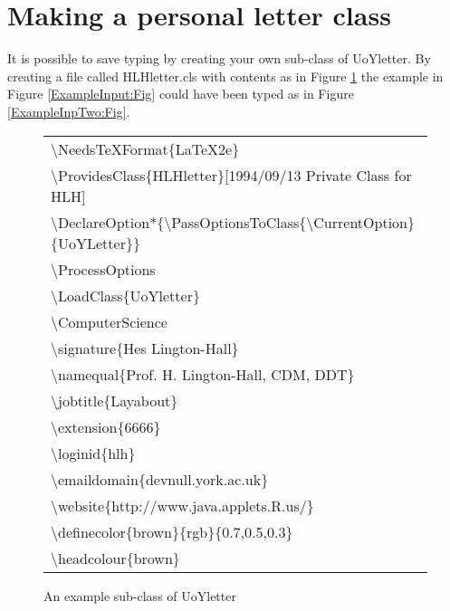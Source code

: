 \documentclass[12pt,a4paper]{article}
\newcommand{\cmdsty}[1]{\textsf{#1}}
\newcommand{\cmd}[1]{\cmdsty{\textbackslash#1}}
\newcommand{\pcmd}[2]{\cmdsty{\cmd{#1}$\{$#2$\}$}}
\begin{document}
\section{Making a personal letter class}

It is possible to save typing by creating your own sub-class of
\cmdsty{UoYletter}.  By creating a file called \cmdsty{HLHletter.cls}
with contents as in Figure \ref{Cls:Fig} the example in Figure
\ref{ExampleInput:Fig} could have been typed as in Figure
\ref{ExampleInpTwo:Fig}.
\begin{figure}
{\sffamily
\begin{tabular}[t]{l}
\pcmd{NeedsTeXFormat}{LaTeX2e}\\
\pcmd{ProvidesClass}{HLHletter}[1994/09/13 Private Class for HLH]\\
\pcmd{DeclareOption*}
        {\pcmd{PassOptionsToClass}{\cmd{CurrentOption}}$\{$UoYLetter$\}$}\\
\cmd{ProcessOptions}\\
\pcmd{LoadClass}{UoYletter}\\
\cmd{ComputerScience}\\
\pcmd{signature}{Hes Lington-Hall}\\
\pcmd{namequal}{Prof. H. Lington-Hall, CDM, DDT}\\
\pcmd{jobtitle}{Layabout}\\
\pcmd{extension}{6666}\\
\pcmd{loginid}{hlh}\\
\pcmd{emaildomain}{devnull.york.ac.uk}\\
\pcmd{website}{http://www.java.applets.R.us/}\\
\pcmd{definecolor}{brown$\}\{$rgb$\}\{$0.7,0.5,0.3}\\
\pcmd{headcolour}{brown}
\end{tabular}
}
\caption{An example sub-class of \cmdsty{UoYletter}}\label{Cls:Fig}
\end{figure}
\end{document}
